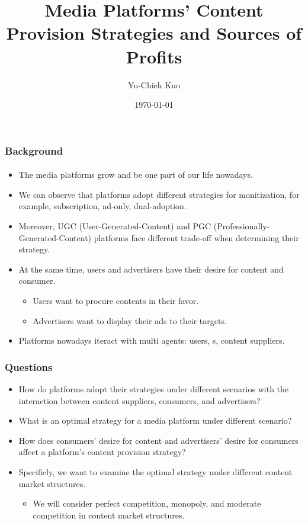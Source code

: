 \documentclass{beamer}
\title{
    Media Platforms' Content Provision Strategies and Sources of Profits
}
\author{Yu-Chieh Kuo\inst{1}}
\date{\today}
\institute[NTU]
{
    \inst{1}
    Department of Information Management,
    National Taiwan University
}
\newcommand{\hl}[1]{\textcolor{myblue}{#1}}
\newcommand{\adv}{\text{advertiser}}
\begin{document}
\begin{frame}
\titlepage
\end{frame}

\begin{frame}%
    \frametitle{Background}
    \framesubtitle{}
    \begin{itemize}
        \item The media platforms grow and be one part
            of our life nowadays.
        \item We can observe that platforms adopt different
            strategies for monitization, for example,
            subscription, ad-only, dual-adoption.
        \item Moreover, UGC (User-Generated-Content) and PGC
            (Professionally-Generated-Content) platforms face
            different trade-off when determining their strategy.
        \item At the same time, users and advertisers have their
            desire for content and consumer.
            \begin{itemize}
                \item Users want to procure contents in their favor.
                \item Advertisers want to display their ads to their targets.
            \end{itemize}
        \item \hl{Platforms nowadays iteract with multi agents: users, \adv s,
            content suppliers.}
    \end{itemize}

\end{frame}


\begin{frame}
    \frametitle{Questions}
    \begin{itemize}
        \item How do platforms adopt their strategies
            under different scenarios with the interaction between content suppliers,
            consumers, and advertisers?
        \item What is an optimal strategy for a media platform under
            different scenario?
        \item How does consumers' desire for content and advertisers' desire
            for consumers affect a platform's content provision strategy?
        \item Specificly, we want to examine the optimal strategy \hl{under different
            content market structures}.
            \begin{itemize}
                \item We will consider \hl{perfect competition, monopoly,} and
                    \hl{moderate competition} in content market structures.
            \end{itemize}
    \end{itemize}
\end{frame}
\end{document}
